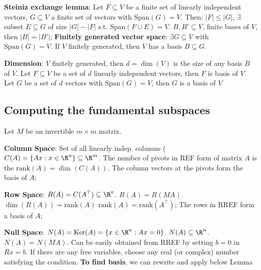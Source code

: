 \setcounter{all}{19} \shortlemma \textbf{Steiniz exchange lemma}: Let $F \subseteq V$ be a finite set of linearly independent vectors, $G \subseteq V$ a finite set of vectors with $\text{Span}(G) = V$. Then: $|F| \leq |G|$, $\exists$ subset $E\subseteq G$ of size $|G| - |F|$ s.t. $\text{Span}(F\cup E) = V$. \shorttheorem $B, B'\subseteq V$, finite bases of $V$, then $|B| = |B'|$;
\shortdef \textbf{Finitely generated vector space}: $\exists G \subseteq V$ with $\text{Span}(G) = V$. \shorttheorem If $V$ finitely generated, then $V$ has a basis $B \subseteq G$.

\shortdef \textbf{Dimension}: $V$ finitely generated, then $d = \dim(V)$ is the size of any basis $B$ of $V$. \shortlemma Let $F \subseteq V$ be a set of $d$ linearly independent vectors, then $F$ is basis of $V$. Let $G$ be a set of $d$ vectors with $\text{Span}(G) = V$, then $G$ is a basis of $V$


\vspace{-0.5pc}
\subsection{Computing the fundamental subspaces}
Let $M$ be an invertible $m \times m$ matrix.

\textbf{Column Space}: Set of all linearly indep. columns ($C(A) = \{Ax : x \in \R^n\} \subseteq \R^m$. 
\shorttheorem The number of pivots in REF form of matrix $A$ is the $\text{rank}(A) = \dim(C(A))$. 
The column vectors at the pivots form the basis of $A$;

\textbf{Row Space}: $R(A) = C(A^{\top}) \subseteq \R^n$. 
\setcounter{all}{27}\shortlemma $R(A) = R(MA)$. \shorttheorem $\dim(R(A)) = \text{rank}(A)$ 
\shorttheorem $\text{rank}(A) = \text{rank}(A^{\top})$;
The rows in RREF form a basis of $A$;

\setcounter{all}{31}\shortdef \textbf{Null Space}: $N(A) = \text{Ker}(A) = \{x \in \R^n : Ax = 0\}$. \shortlemma $N(A) \subseteq \R^n$. 
\shortlemma $N(A) = N(MA)$.
Can be easily obtained from RREF by setting $b = 0$ in $Rx = b$.
If there are any free variables, choose any real (or complex) number satisfying the condition.
\textbf{To find basis}, we can rewrite and apply below Lemma

